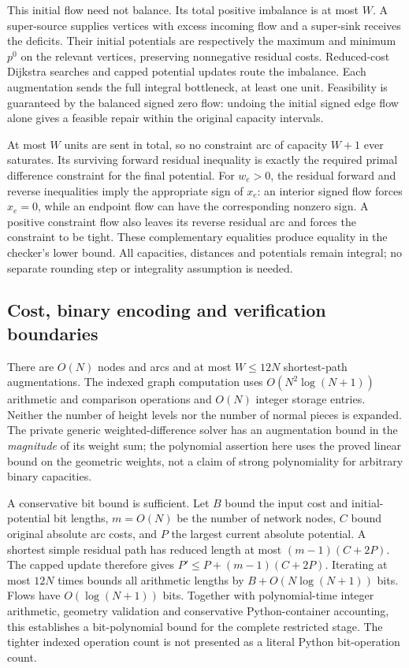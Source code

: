 This initial flow need not balance. Its total positive imbalance is at most
$W$. A super-source supplies vertices with excess incoming flow and a
super-sink receives the deficits. Their initial potentials are respectively
the maximum and minimum $p^0$ on the relevant vertices, preserving
nonnegative residual costs. Reduced-cost Dijkstra searches and capped
potential updates route the imbalance. Each augmentation sends the full
integral bottleneck, at least one unit. Feasibility is guaranteed by the
balanced signed zero flow: undoing the initial signed edge flow alone gives
a feasible repair within the original capacity intervals.

At most $W$ units are sent in total, so no constraint arc of capacity $W+1$
ever saturates. Its surviving forward residual inequality is exactly the
required primal difference constraint for the final potential. For $w_e>0$, the residual forward and reverse inequalities imply the
appropriate sign of $x_e$: an interior signed flow forces $x_e=0$, while
an endpoint flow can have the corresponding nonzero sign. A positive
constraint flow also leaves its reverse residual arc and forces the
constraint to be tight. These complementary equalities produce equality in
the checker's lower bound. All capacities, distances and potentials remain
integral; no separate rounding step or integrality assumption is needed.

\subsection{Cost, binary encoding and verification boundaries}

There are $O(N)$ nodes and arcs and at most $W\leq12N$ shortest-path
augmentations. The indexed graph computation uses $O(N^2\log(N+1))$
arithmetic and comparison operations and $O(N)$ integer storage entries.
Neither the number of height levels nor the number of normal pieces is
expanded. The private generic weighted-difference solver has an augmentation
bound in the \emph{magnitude} of its weight sum; the polynomial assertion here
uses the proved linear bound on the geometric weights, not a claim of strong
polynomiality for arbitrary binary capacities.

A conservative bit bound is sufficient. Let $B$ bound the input cost and
initial-potential bit lengths, $m=O(N)$ be the number of network nodes,
$C$ bound original absolute arc costs, and $P$ the largest current absolute
potential. A shortest simple residual path has reduced length at most
$(m-1)(C+2P)$. The capped update therefore gives
$P'\leq P+(m-1)(C+2P)$. Iterating at most $12N$ times bounds all arithmetic
lengths by $B+O(N\log(N+1))$ bits. Flows have $O(\log(N+1))$ bits. Together
with polynomial-time integer arithmetic, geometry validation and conservative
Python-container accounting, this establishes a bit-polynomial bound for
the complete restricted stage. The tighter indexed operation count is not
presented as a literal Python bit-operation count.

